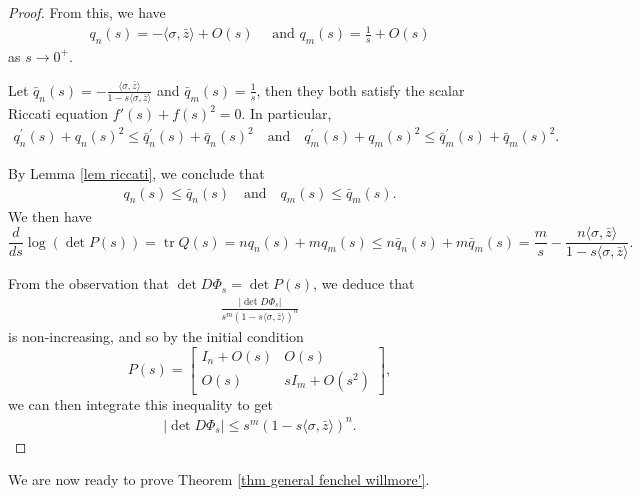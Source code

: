 \documentclass[11pt, reqno]{amsart}
\numberwithin{equation}{section}
\begin{document}
\begin{proof}
From this, we have
\begin{align*}
q_n(s)=-\langle \sigma, \bar z\rangle +O(s)\quad \text{ and } q_m(s)=\frac{1}{s} +O(s)
\end{align*}
as $s\to0^+$.

Let $\bar q_n(s)=-\frac{\langle \sigma, \bar z\rangle }{1-s\langle \sigma, \bar z\rangle}$ and $\bar q_m(s)=\frac{1}{s}$, then they both satisfy the scalar Riccati equation $f'(s)+f(s)^2=0$. In particular,
\begin{align*}
q_n^{\prime}(s)+q_n(s)^2 \le \bar q_n^{\prime}(s)+\bar q_n(s)^2\quad \text{and}\quad q_m^{\prime}(s)+q_m(s)^2 \le \bar q_m^{\prime}(s)+\bar q_m(s)^2.
\end{align*}

By Lemma \ref{lem riccati}, we conclude that
\begin{align*}
q_n(s) \le\bar q_n(s)\quad \text{and}\quad q_m(s) \le\bar q_m(s).
\end{align*}
We then have
$$
\frac{d}{d s} \log (\det P(s))=\operatorname{tr} Q(s)
=n q_n(s) +m q_m(s) \le n\bar q_n(s) +m \bar q_m(s)=\frac{m}{s}-\frac{n\langle\sigma, \bar{z}\rangle}{1-s\langle\sigma, \bar{z}\rangle}.
$$

From the observation that $\det D\Phi_s =\det P(s)$, we deduce that
\begin{align*}
\frac{|\det D\Phi_s|}{s^m(1-s\langle \sigma, \bar z\rangle)^n}
\end{align*}
is non-increasing, and so by the initial condition
\begin{equation*}
P(s)=\begin{bmatrix}
I_n+ O(s) & O(s) \\
O(s) & s I_m+O(s^2)
\end{bmatrix},
\end{equation*}
we can then integrate this inequality to get
\begin{align*}
|\det D\Phi_s|\le {s^m(1-s\langle \sigma, \bar z\rangle)^n}.
\end{align*}
\end{proof}
We are now ready to prove Theorem \ref{thm general fenchel willmore'}.
\end{document}
